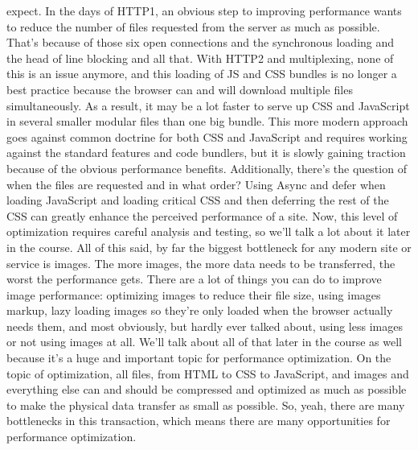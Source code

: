 expect. In the days of HTTP1, an obvious step to improving performance 
wants to reduce the number of files requested from the server as much as
possible. That's because of those six open connections and the 
synchronous loading and the head of line blocking and all that. With 
HTTP2 and multiplexing, none of this is an issue anymore, and this 
loading of JS and CSS bundles is no longer a best practice because the 
browser can and will download multiple files simultaneously. As a 
result, it may be a lot faster to serve up CSS and JavaScript in 
several smaller modular files than one big bundle. This more modern 
approach goes against common doctrine for both CSS and JavaScript and
requires working against the standard features and code bundlers, but 
it is slowly gaining traction because of the obvious performance 
benefits. Additionally, there's the question of when the files are 
requested and in what order? Using Async and defer when loading 
JavaScript and loading critical CSS and then deferring the rest of the 
CSS can greatly enhance the perceived performance of a site. Now, this 
level of optimization requires careful analysis and testing, so we'll 
talk a lot about it later in the course. All of this said, by far the
biggest bottleneck for any modern site or service is images. The more
images, the more data needs to be transferred, the worst the 
performance gets. There are a lot of things you can do to improve 
image performance: optimizing images to reduce their file size, using 
images markup, lazy loading images so they're only loaded when the 
browser actually needs them, and most obviously, but hardly ever 
talked about, using less images or not using images at all. We'll 
talk about all of that later in the course as well because it's 
a huge and important topic for performance optimization. On the 
topic of optimization, all files, from HTML to CSS to JavaScript, 
and images and everything else can and should be compressed and 
optimized as much as possible to make the physical data transfer as 
small as possible. So, yeah, there are many bottlenecks in this 
transaction, which means there are many opportunities for 
performance optimization.


